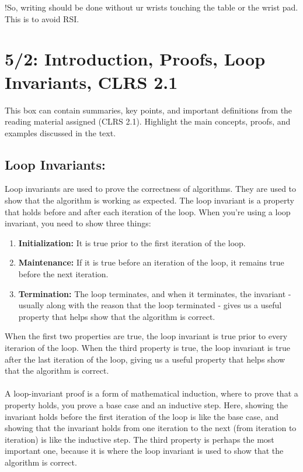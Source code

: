 
!So, writing should be done without ur wrists touching the table or the wrist pad. This is to avoid RSI.\\

\section{5/2: Introduction, Proofs, Loop Invariants, CLRS 2.1}

\begin{tcolorbox}[title=Chapter Quick Summary Notes (CRLS 2.1)]
  This box can contain summaries, key points, and important definitions from the reading material assigned (CLRS 2.1). Highlight the main concepts, proofs, and examples discussed in the text.
\end{tcolorbox}

\subsection{Loop Invariants:}
Loop invariants are used to prove the correctness of algorithms. They are used to show that the algorithm is working as expected. The loop invariant is a property that holds before and after each iteration of the loop. When you're using a loop invariant, you need to show three things:

\begin{enumerate}
  \item \textbf{Initialization:} It is true prior to the first iteration of the loop.
  \item \textbf{Maintenance:} If it is true before an iteration of the loop, it remains true before the next iteration.
  \item \textbf{Termination:} The loop terminates, and when it terminates, the invariant - usually along with the reason that the loop terminated - gives us a useful property that helps show that the algorithm is correct.
\end{enumerate}
When the first two properties are true, the loop invariant is true prior to every iterarion of the loop. When the third property is true, the loop invariant is true after the last iteration of the loop, giving us a useful property that helps show that the algorithm is correct.
\\ \\
A loop-invariant proof is a form of mathematical induction, where to prove that a property holds, you prove a base case and an inductive step. Here, showing the invariant holds before the first iteration of the loop is like the base case, and showing that the invariant holds from one iteration to the next (from iteration to iteration) is like the inductive step. The third property is perhaps the most important one, because it is where the loop invariant is used to show that the algorithm is correct.



